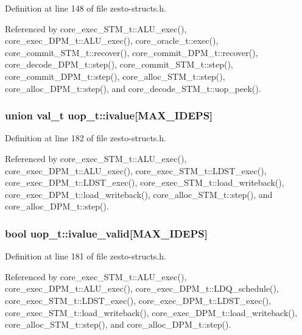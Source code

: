 Definition at line 148 of file zesto-structs.h.

Referenced by core\_\-exec\_\-STM\_\-t::ALU\_\-exec(), core\_\-exec\_\-DPM\_\-t::ALU\_\-exec(), core\_\-oracle\_\-t::exec(), core\_\-commit\_\-STM\_\-t::recover(), core\_\-commit\_\-DPM\_\-t::recover(), core\_\-decode\_\-DPM\_\-t::step(), core\_\-commit\_\-STM\_\-t::step(), core\_\-commit\_\-DPM\_\-t::step(), core\_\-alloc\_\-STM\_\-t::step(), core\_\-alloc\_\-DPM\_\-t::step(), and core\_\-decode\_\-STM\_\-t::uop\_\-peek().
\subsubsection[{ivalue}]{\setlength{\rightskip}{0pt plus 5cm}union {\bf val\_\-t} {\bf uop\_\-t::ivalue}[MAX\_\-IDEPS]\hspace{0.3cm}{\tt  [write]}}\label{structuop__t_86094935a31d7cd09945c60b74813abb}




Definition at line 182 of file zesto-structs.h.

Referenced by core\_\-exec\_\-STM\_\-t::ALU\_\-exec(), core\_\-exec\_\-DPM\_\-t::ALU\_\-exec(), core\_\-exec\_\-STM\_\-t::LDST\_\-exec(), core\_\-exec\_\-DPM\_\-t::LDST\_\-exec(), core\_\-exec\_\-STM\_\-t::load\_\-writeback(), core\_\-exec\_\-DPM\_\-t::load\_\-writeback(), core\_\-alloc\_\-STM\_\-t::step(), and core\_\-alloc\_\-DPM\_\-t::step().
\subsubsection[{ivalue\_\-valid}]{\setlength{\rightskip}{0pt plus 5cm}bool {\bf uop\_\-t::ivalue\_\-valid}[MAX\_\-IDEPS]}\label{structuop__t_1f2942c6edfb3dd4179550a04ed91b25}




Definition at line 181 of file zesto-structs.h.

Referenced by core\_\-exec\_\-STM\_\-t::ALU\_\-exec(), core\_\-exec\_\-DPM\_\-t::ALU\_\-exec(), core\_\-exec\_\-DPM\_\-t::LDQ\_\-schedule(), core\_\-exec\_\-STM\_\-t::LDST\_\-exec(), core\_\-exec\_\-DPM\_\-t::LDST\_\-exec(), core\_\-exec\_\-STM\_\-t::load\_\-writeback(), core\_\-exec\_\-DPM\_\-t::load\_\-writeback(), core\_\-alloc\_\-STM\_\-t::step(), and core\_\-alloc\_\-DPM\_\-t::step().
